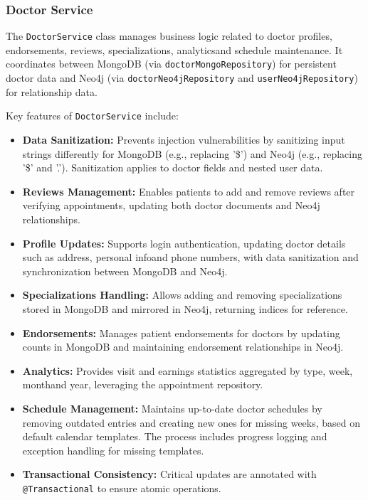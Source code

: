 \subsubsection{Doctor Service}

The \texttt{DoctorService} class manages business logic related to doctor profiles, endorsements, reviews, specializations, analyticsand schedule maintenance. It coordinates between MongoDB (via \texttt{doctorMongoRepository}) for persistent doctor data and Neo4j (via \texttt{doctorNeo4jRepository} and \texttt{userNeo4jRepository}) for relationship data.

Key features of \texttt{DoctorService} include:
\begin{itemize}
	\item \textbf{Data Sanitization:} Prevents injection vulnerabilities by sanitizing input strings differently for MongoDB (e.g., replacing '\$') and Neo4j (e.g., replacing '\$' and '.'). Sanitization applies to doctor fields and nested user data.
	
	\item \textbf{Reviews Management:} Enables patients to add and remove reviews after verifying appointments, updating both doctor documents and Neo4j relationships.
	
	\item \textbf{Profile Updates:} Supports login authentication, updating doctor details such as address, personal infoand phone numbers, with data sanitization and synchronization between MongoDB and Neo4j.
	
	\item \textbf{Specializations Handling:} Allows adding and removing specializations stored in MongoDB and mirrored in Neo4j, returning indices for reference.
	
	\item \textbf{Endorsements:} Manages patient endorsements for doctors by updating counts in MongoDB and maintaining endorsement relationships in Neo4j.
	
	\item \textbf{Analytics:} Provides visit and earnings statistics aggregated by type, week, monthand year, leveraging the appointment repository.
	
	\item \textbf{Schedule Management:} Maintains up-to-date doctor schedules by removing outdated entries and creating new ones for missing weeks, based on default calendar templates. The process includes progress logging and exception handling for missing templates.
	
	\item \textbf{Transactional Consistency:} Critical updates are annotated with \texttt{@Transactional} to ensure atomic operations.
\end{itemize}

